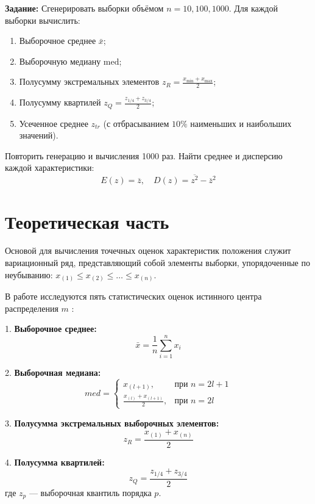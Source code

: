 \documentclass[a4paper, 14pt]{extarticle}
\begin{document}
\textbf{Задание:}
Сгенерировать выборки объёмом $n = 10, 100, 1000$. Для каждой выборки вычислить:
\begin{enumerate}
    \item Выборочное среднее $\bar{x}$;
    \item Выборочную медиану $\text{med}$;
    \item Полусумму экстремальных элементов $z_R = \frac{x_{\min} + x_{\max}}{2}$;
    \item Полусумму квартилей $z_Q = \frac{z_{1/4} + z_{3/4}}{2}$;
    \item Усеченное среднее $z_{tr}$ (с отбрасыванием $10\%$ наименьших и наибольших значений).
\end{enumerate}

Повторить генерацию и вычисления 1000 раз. Найти среднее и дисперсию каждой характеристики: $$E(z) = \overline{z},\quad D(z) = \overline{z^2} - \overline{z}^2$$

\section{Теоретическая часть}

Основой для вычисления точечных оценок характеристик положения служит вариационный ряд, представляющий собой элементы выборки, упорядоченные по неубыванию: $x_{(1)} \le x_{(2)} \le \dots \le x_{(n)}$.

В работе исследуются пять статистических оценок истинного центра распределения $m$ \cite{babakhina, maksimov}:

1. \textbf{Выборочное среднее:}
\begin{equation}
    \bar{x} = \frac{1}{n}\sum_{i=1}^n x_i
\end{equation}

2. \textbf{Выборочная медиана:}
\begin{equation}
    med = 
    \begin{cases}
        x_{(l+1)}, & \text{при } n = 2l + 1 \\
        \frac{x_{(l)} + x_{(l+1)}}{2}, & \text{при } n = 2l
    \end{cases}
\end{equation}

3. \textbf{Полусумма экстремальных выборочных элементов:}
\begin{equation}
    z_R = \frac{x_{(1)} + x_{(n)}}{2}
\end{equation}

4. \textbf{Полусумма квартилей:}
\begin{equation}
    z_Q = \frac{z_{1/4} + z_{3/4}}{2}
\end{equation}
где $z_p$ — выборочная квантиль порядка $p$.
\end{document}
